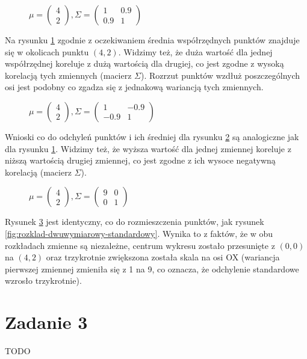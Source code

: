 \documentclass{article}
\begin{document}
\begin{figure}[htbp]
  \centering
  
  \caption{$\mu = \begin{pmatrix}
4\\
2
\end{pmatrix}, \Sigma = \begin{pmatrix}
1 & 0.9 \\
0.9 & 1
\end{pmatrix}$}
  \label{fig:NormalA}
\end{figure}

Na rysunku \ref{fig:NormalA} zgodnie z oczekiwaniem średnia współrzędnych punktów znajduje się w okolicach punktu $(4,2)$. Widzimy też, że duża wartość dla jednej współrzędnej koreluje z dużą wartością dla drugiej, co jest zgodne z wysoką korelacją tych zmiennych (macierz $\Sigma$). Rozrzut punktów wzdłuż poszczególnych osi jest podobny co zgadza się z jednakową wariancją tych zmiennych.

\begin{figure}[htbp]
  \centering
  
  \caption{$\mu = \begin{pmatrix}
4\\
2
\end{pmatrix}, \Sigma = \begin{pmatrix}
1 & -0.9 \\
-0.9 & 1
\end{pmatrix}$}
  \label{fig:NormalB}
\end{figure}
Wnioski co do odchyleń punktów i ich średniej dla rysunku \ref{fig:NormalB} są analogiczne jak dla rysunku \ref{fig:NormalA}. Widzimy też, że wyższa wartość dla jednej zmiennej koreluje z niższą wartością drugiej zmiennej, co jest zgodne z ich wysoce negatywną korelacją (macierz $\Sigma$).


\begin{figure}[htbp]
  \centering
  
  \caption{$\mu = \begin{pmatrix}
4\\
2
\end{pmatrix}, \Sigma = \begin{pmatrix}
9 & 0 \\
0 & 1
\end{pmatrix}$}
  \label{fig:NormalC}
\end{figure}
Rysunek \ref{fig:NormalC} jest identyczny, co do rozmieszczenia punktów, jak rysunek \ref{fig:rozklad-dwuwymiarowy-standardowy}. Wynika to z faktów, że w obu rozkładach zmienne są niezależne, centrum wykresu zostało przesunięte z $(0, 0)$ na $(4, 2)$ oraz trzykrotnie zwiększona została skala na osi OX (wariancja pierwszej zmiennej zmieniła się z 1 na 9, co oznacza, że odchylenie standardowe wzrosło trzykrotnie).


\section{Zadanie 3}
TODO
\end{document}
